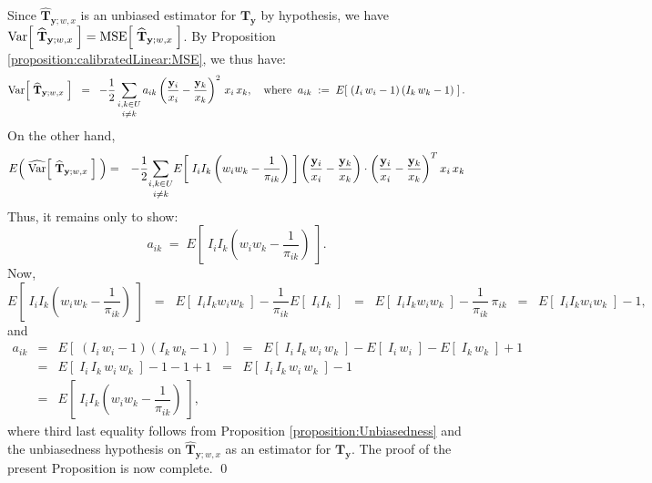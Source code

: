 \documentclass{article}
\begin{document}
\vskip 0.5cm
\proof
Since $\widehat{\mathbf{T}}_{\mathbf{y};w,x}$ is an unbiased estimator for $\mathbf{T}_{\mathbf{y}}$ by hypothesis, we have
$\textnormal{Var}\!\left[\;\widehat{\mathbf{T}}_{\mathbf{y};w,x}\;\right] = \textnormal{MSE}\!\left[\;\widehat{\mathbf{T}}_{\mathbf{y};w,x}\;\right]$.
By Proposition \ref{proposition:calibratedLinear:MSE}, we thus have:
\begin{equation*}
\textnormal{Var}\!\left[\;\widehat{\mathbf{T}}_{\mathbf{y};w,x}\;\right]
\;\;=\;\;
- \dfrac{1}{2}\,\underset{i \neq k}{\sum_{i,k\in U}}\,a_{ik}\left(\dfrac{\mathbf{y}_{i}}{x_{i}} - \dfrac{\mathbf{y}_{k}}{x_{k}}\right)^{2}\,x_{i}\,x_{k},
\quad\textnormal{where}\;\;
a_{ik} \;:=\; E\!\left[\;\left(I_{i}\,w_{i}-1\right)\left(I_{k}\,w_{k}-1\right)\;\right].
\end{equation*}
On the other hand,
\begin{eqnarray*}
E\!\left(\;\widehat{\textnormal{Var}}\!\left[\;\widehat{\mathbf{T}}_{\mathbf{y};w,x} \;\right]\;\right)
&=& 
-\dfrac{1}{2}\underset{i \neq k}{\sum_{i,k\in U}}
E\!\left[\;I_{i}I_{k}\left(w_{i}w_{k} - \dfrac{1}{\pi_{ik}}\right)\;\right]
\left(\dfrac{\mathbf{y}_{i}}{x_{i}} - \dfrac{\mathbf{y}_{k}}{x_{k}}\right)\cdot\left(\dfrac{\mathbf{y}_{i}}{x_{i}} - \dfrac{\mathbf{y}_{k}}{x_{k}}\right)^{T}
x_{i}\,x_{k}
\end{eqnarray*}
Thus, it remains only to show:
\begin{equation*}
a_{ik} \;=\; E\!\left[\;I_{i}I_{k}\left(w_{i}w_{k} - \dfrac{1}{\pi_{ik}}\right)\;\right].
\end{equation*}
Now,
\begin{equation*}
E\!\left[\;I_{i}I_{k}\left(w_{i}w_{k} - \dfrac{1}{\pi_{ik}}\right)\;\right]
\;\;=\;\; E\!\left[\;I_{i}I_{k}w_{i}w_{k}\;\right] - \dfrac{1}{\pi_{ik}}E\!\left[\;I_{i}I_{k}\;\right]
\;\;=\;\; E\!\left[\;I_{i}I_{k}w_{i}w_{k}\;\right] - \dfrac{1}{\pi_{ik}}\,\pi_{ik}
\;\;=\;\; E\!\left[\;I_{i}I_{k}w_{i}w_{k}\;\right] - 1,
\end{equation*}
and
\begin{eqnarray*}
a_{ik}
&=& E\!\left[\;\left(I_{i}\,w_{i}-1\right)\left(I_{k}\,w_{k}-1\right)\;\right]
\;\;=\;\; E\!\left[\;I_{i}\,I_{k}\,w_{i}\,w_{k}\;\right] - E\!\left[\;I_{i}\,w_{i}\;\right] - E\!\left[\;I_{k}\,w_{k}\;\right] + 1 \\
&=&E\!\left[\;I_{i}\,I_{k}\,w_{i}\,w_{k}\;\right] - 1 - 1 + 1
\;\;=\;\; E\!\left[\;I_{i}\,I_{k}\,w_{i}\,w_{k}\;\right] - 1 \\
&=& E\!\left[\;I_{i}I_{k}\left(w_{i}w_{k} - \dfrac{1}{\pi_{ik}}\right)\;\right],
\end{eqnarray*}
where third last equality follows from Proposition \ref{proposition:Unbiasedness} and
the unbiasedness hypothesis on $\widehat{\mathbf{T}}_{\mathbf{y};w,x}$ as an estimator for $\mathbf{T}_{\mathbf{y}}$.
The proof of the present Proposition is now complete.  \qed
\end{document}
